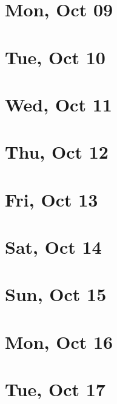 	\section{Mon, Oct 09}
		
		
	\section{Tue, Oct 10}
		
		
	\section{Wed, Oct 11}
		
		
	\section{Thu, Oct 12}
		
		
	\section{Fri, Oct 13}
		
		
	\section{Sat, Oct 14}
		
		
	\section{Sun, Oct 15}
		
		
	\section{Mon, Oct 16}
		
		
	\section{Tue, Oct 17}
		
		
